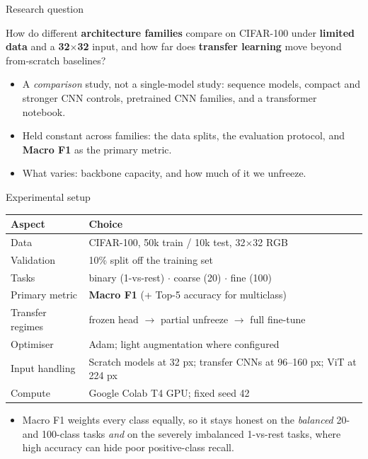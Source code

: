 \documentclass[aspectratio=169,11pt]{beamer}
\begin{document}
\begin{frame}{Research question}
  \vfill
  \begin{block}{}
    \centering\large
    How do different \textbf{architecture families} compare on CIFAR-100
    under \textbf{limited data} and a \textbf{32$\times$32} input, and how far does
    \textbf{transfer learning} move beyond from-scratch baselines?
  \end{block}
  \vfill
  \begin{itemize}
    \item A \emph{comparison} study, not a single-model study: sequence models, compact and
          stronger CNN controls, pretrained CNN families, and a transformer notebook.
    \item Held constant across families: the data splits, the evaluation protocol, and
          \textbf{Macro F1} as the primary metric.
    \item What varies: backbone capacity, and how much of it we unfreeze.
  \end{itemize}
  \vfill
\end{frame}


\begin{frame}{Experimental setup}
  \centering
  \renewcommand{\arraystretch}{1.25}
  \begin{tabular}{@{}ll@{}}
    \toprule
    \textbf{Aspect} & \textbf{Choice} \\
    \midrule
    Data            & CIFAR-100, 50k train / 10k test, 32$\times$32 RGB \\
    Validation      & 10\% split off the training set \\
    Tasks           & binary (1-vs-rest) $\cdot$ coarse (20) $\cdot$ fine (100) \\
    Primary metric  & \textbf{Macro F1} \;(+ Top-5 accuracy for multiclass) \\
    Transfer regimes& frozen head $\rightarrow$ partial unfreeze $\rightarrow$ full fine-tune \\
    Optimiser       & Adam; light augmentation where configured \\
    Input handling  & Scratch models at 32 px; transfer CNNs at 96--160 px; ViT at 224 px \\
    Compute         & Google Colab T4 GPU; fixed seed 42 \\
    \bottomrule
  \end{tabular}

  \vfill
  \begin{itemize}
    \item Macro F1 weights every class equally, so it stays honest on the
          \emph{balanced} 20- and 100-class tasks \emph{and} on the severely
          imbalanced 1-vs-rest tasks, where high accuracy can hide poor positive-class recall.
  \end{itemize}
\end{frame}
\end{document}
